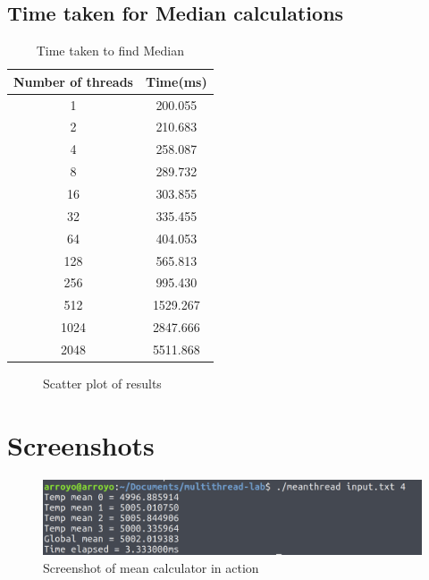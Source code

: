 \documentclass{article}
\begin{document}
    	\subsection{Time taken for Median calculations}
    	\begin{table}[H]
	    	\begin{center}
	    	\begin{tabular}{c | c }
	    	\textbf{Number of threads} & \textbf{Time(ms)} \\ \hline
	    	1 & 200.055 \\
			2 & 210.683 \\
			4 & 258.087 \\
			8 & 289.732 \\
			16 & 303.855 \\
			32 & 335.455 \\
			64 & 404.053 \\
			128 & 565.813 \\
			256 & 995.430 \\
			512 & 1529.267 \\
			1024 & 2847.666 \\
			2048 & 5511.868 
	    	\end{tabular}
	    	\caption{Time taken to find Median}
	    	\end{center}
    	\end{table}

    	\begin{figure}[H]
			\caption{Scatter plot of results}
    	\end{figure}

    \section{Screenshots}
    	\begin{figure}[H]
    		\centering
    		\includegraphics[width=\linewidth]{mean_screenshot.png}
    		\caption{Screenshot of mean calculator in action}
    	\end{figure}
\end{document}
